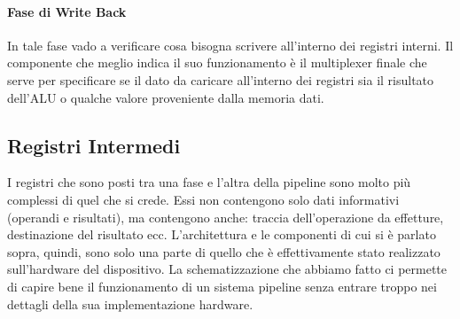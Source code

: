 \paragraph{Fase di Write Back}
In tale fase vado a verificare cosa bisogna scrivere all'interno dei registri interni. Il componente che meglio indica il suo funzionamento è il multiplexer finale che serve per specificare se il dato da caricare all'interno dei registri sia il risultato dell'ALU o qualche valore proveniente dalla memoria dati. 

\subsection{Registri Intermedi}
I registri che sono posti tra una fase e l'altra della pipeline sono molto più complessi di quel che si crede. Essi non contengono solo dati informativi (operandi e risultati), ma contengono anche: traccia dell'operazione da effetture, destinazione del risultato ecc. 
L'architettura e le componenti di cui si è parlato sopra, quindi, sono solo una parte di quello che è effettivamente stato realizzato sull'hardware del dispositivo.
La schematizzazione che abbiamo fatto ci permette di capire bene il funzionamento di un sistema pipeline senza entrare troppo nei dettagli della sua implementazione hardware.

